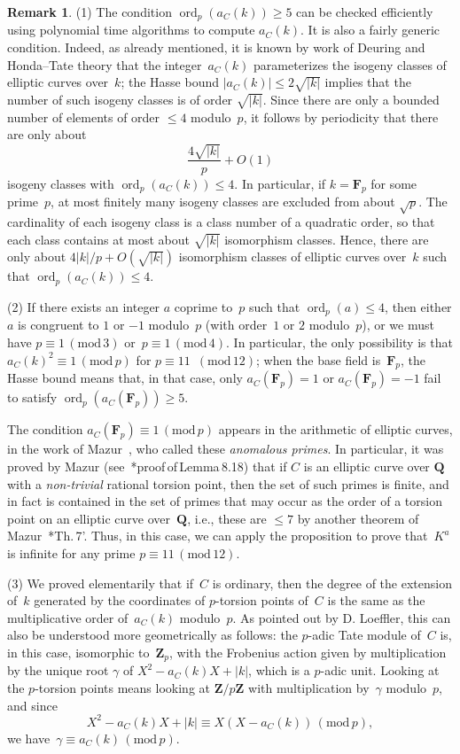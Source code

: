 \documentclass[12pt]{amsart}
\renewcommand{\leq}{\leqslant}
\renewcommand{\geq}{\geqslant}
\numberwithin{equation}{section}
\newcommand{\Zz}{\mathbf{Z}}
\newcommand{\Qq}{\mathbf{Q}}
\newcommand{\Ff}{\mathbf{F}}
\newcommand{\mods}[1]{\,(\mathrm{mod}\,{#1})}
\DeclareMathOperator{\ord}{ord}
\theoremstyle{plain}
\theoremstyle{remark}
\theoremstyle{definition}
\newtheorem{remark}[theorem]{Remark}
\renewcommand{\geq}{\geqslant}
\renewcommand{\leq}{\leqslant}
\begin{document}
\begin{remark}
  (1) The condition $\ord_p(a_C(k))\geq 5$ can be checked efficiently
  using polynomial time algorithms to compute $a_C(k)$. It is also a
  fairly generic condition. Indeed, as already mentioned, it is known by
  work of Deuring and Honda--Tate theory that the integer~$a_C(k)$
  parameterizes the isogeny classes of elliptic curves over~$k$; the
  Hasse bound $|a_C(k)|\leq 2\sqrt{|k|}$ implies that the number of such
  isogeny classes is of order $\sqrt{|k|}$. Since there are only a
  bounded number of elements of order $\leq 4$ modulo~$p$, it follows by
  periodicity that there are only about
  \[
    \frac{4\sqrt{|k|}}{p}+O(1)
  \]
  isogeny classes with $\ord_p(a_C(k))\leq 4$. In particular, if
  $k=\Ff_p$ for some prime~$p$, at most finitely many isogeny classes
  are excluded from about $\sqrt{p}$. The cardinality of each isogeny
  class is a class number of a quadratic order, so that each class
  contains at most about $\sqrt{|k|}$ isomorphism classes. Hence, there
  are only about $4|k|/p+O(\sqrt{|k|})$ isomorphism classes of elliptic
  curves over~$k$ such that $\ord_p(a_C(k))\leq 4$.
  
  (2) If there exists an integer $a$ coprime to~$p$ such that
  $\ord_p(a)\leq 4$, then either $a$ is congruent to $1$ or $-1$
  modulo~$p$ (with order~$1$ or $2$ modulo~$p$), or we must have
  \hbox{$p\equiv 1\mods{3}$} or~\hbox{$p\equiv 1\mods{4}$}. In particular, the only possibility is that $a_C(k)^2\equiv 1\mods{p}$ for
\hbox{$p\equiv 11$} $\mods{12}$; when the base field is~$\Ff_p$, the
  Hasse bound means that, in that case, only \hbox{$a_C(\Ff_p)=1$} or
  $a_C(\Ff_p)=-1$ fail to satisfy $\ord_p(a_C(\Ff_p))\geq 5$.

  The condition $a_C(\Ff_p)\equiv 1\mods{p}$ appears in the arithmetic
  of elliptic curves, in the work of Mazur~\cite{mazur}, who called
  these \emph{anomalous primes}. In particular, it was proved by Mazur
  (see~\cite{mazur}*{proof\,of\,Lemma\,8.18}) that if $C$ is an
  elliptic curve over $\Qq$ with a \emph{non-trivial} rational torsion
  point, then the set of such primes is finite, and in fact is
  contained in the set of primes that may occur as the order of a
  torsion point on an elliptic curve over~$\Qq$, i.e., these are
  $\leq 7$ by another theorem of Mazur~\cite{mazur2}*{Th.\,7'}. Thus,
  in this case, we can apply the proposition to prove that~$K^a$ is
  infinite for any prime $p\equiv 11\mods{12}$.

  (3) We proved elementarily that if~$C$ is ordinary, then the degree of
  the extension of~$k$ generated by the coordinates of $p$-torsion
  points of~$C$ is the same as the multiplicative order of~$a_C(k)$
  modulo~$p$. As pointed out by D. Loeffler, this can also be understood
  more geometrically as follows: the $p$-adic Tate module of~$C$ is, in
  this case, isomorphic to~$\Zz_p$, with the Frobenius action given by
  multiplication by the unique root $\gamma$ of $X^2-a_C(k)X+|k|$, which
  is a $p$-adic unit.  Looking at the $p$-torsion points means looking
  at $\Zz/p\Zz$ with multiplication by~$\gamma$ modulo~$p$, and since
  \[
    X^2-a_C(k)X+|k|\equiv X(X-a_C(k))\mods{p},
  \]
  we have~$\gamma\equiv a_C(k)\mods{p}$.
\end{remark}
\end{document}
